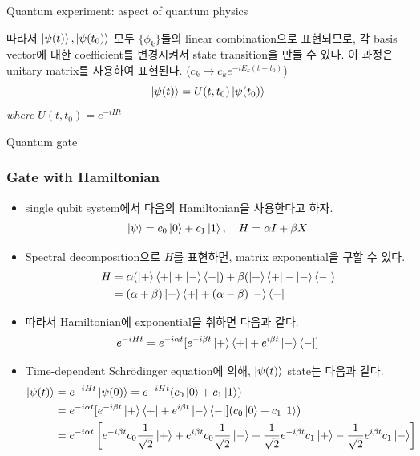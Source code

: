 \documentclass[9pt]{beamer}
\begin{document}
\begin{section}{Quantum experiment: aspect of quantum physics}
\begin{frame}
            \vspace{0.5cm}
            따라서 $\ket{\psi(t)}, \ket{\psi(t_0)}$ 모두 $\{\phi_k\}$들의 linear combination으로 표현되므로, 각 basis vector에 대한 coefficient를 변경시켜서 state transition을 만들 수 있다. 이 과정은 unitary matrix를 사용하여 표현된다. ($c_k \rightarrow c_k e^{-i E_k (t-t_0)}$)
            $$\ket{\psi(t)} = U(t, t_0) \ket{\psi(t_0)}$$
            \textit{where} $U(t, t_0) = e^{-iHt}$
        \end{frame}
    \end{section}

    \begin{section}{Quantum gate}
        
        \begin{frame}
            \frametitle{Gate with Hamiltonian}
            \begin{itemize}
                \item single qubit system에서 다음의 Hamiltonian을 사용한다고 하자. %
                $$\ket{\psi} = c_0 \ket0 + c_1 \ket 1,\quad H = \alpha I + \beta X$$
                \item Spectral decomposition으로 $H$를 표현하면, matrix exponential을 구할 수 있다.
                \begin{align*} H &= \alpha(\ket + \bra + + \ket - \bra - ) + \beta(\ket + \bra + - \ket- \bra -) \\ &= (\alpha+ \beta) \ket + \bra + + (\alpha - \beta) \ket - \bra -\end{align*}
                \item 따라서 Hamiltonian에 exponential을 취하면 다음과 같다.
                $$e^{-iHt} = e^{-i\alpha t}[e^{-i\beta t}\ket+ \bra + + e^{i\beta t} \ket - \bra -]$$
                \item Time-dependent Schrödinger equation에 의해, $\ket{\psi(t)}$ state는 다음과 같다.
                \begin{align*}
                    \ket{\psi(t)} &= e^{-iHt} \ket{\psi(0)} = e^{-iHt} (c_0 \ket{0} + c_1 \ket{1}) \\ &=e^{-i\alpha t}[e^{-i\beta t}\ket+ \bra + + e^{i\beta t} \ket - \bra -](c_0 \ket{0} + c_1 \ket{1})\\ 
                    &= e^{-i\alpha t}\left[ e^{-i\beta t}c_0 \frac{1}{\sqrt 2} \ket{+}+e^{i\beta t}c_0 \frac{1}{\sqrt 2} \ket{-}+ \frac{1}{\sqrt 2}e^{-i\beta t}c_1 \ket{+}- \frac{1}{\sqrt 2}e^{i\beta t}c_1 \ket{-}\right] \end{align*}


\end{itemize}
\end{frame}
\end{section}
\end{document}
